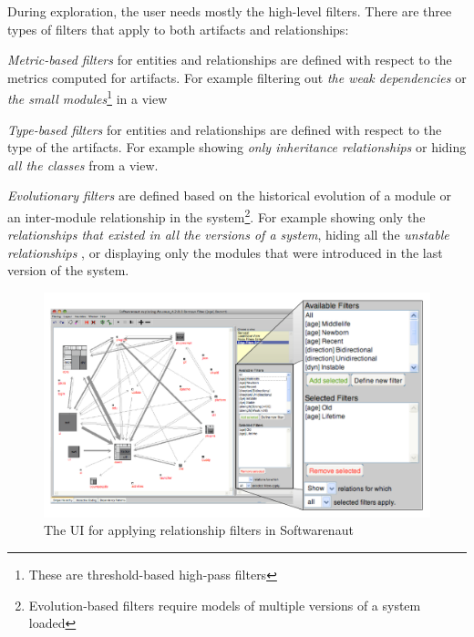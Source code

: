 \documentclass[preprint,12pt]{elsarticle}
\begin{document}
During exploration, the user needs mostly the high-level filters. There are three types of filters that apply to both artifacts and relationships: 

\begin{description}
\item {\em Metric-based filters} for entities and relationships are defined with respect to the metrics computed for artifacts. For example filtering out {\em the weak dependencies} or {\em the small modules}\footnote{These are threshold-based high-pass filters} in a view

\item {\em Type-based filters} for entities and relationships are defined with respect to the type of the artifacts. For example showing {\em only inheritance relationships} or hiding {\em all the classes} from a view.

\item {\em Evolutionary filters} are defined based on the historical evolution of a module or an inter-module relationship in the system\footnote{Evolution-based filters require models of multiple versions of a system loaded}. For example showing only the {\em relationships that existed in all the versions of a system}, hiding all the {\em unstable relationships} \cite{lungu-relevo}, or displaying only the modules that were introduced in the last version of the system.
\end{description}

\begin{figure}[ht]
\begin{center}
\includegraphics[width=0.95\linewidth]{SnautFilteringPanel}
\caption{The UI for applying relationship filters in Softwarenaut}
\end{center}
\end{figure}
\end{document}
